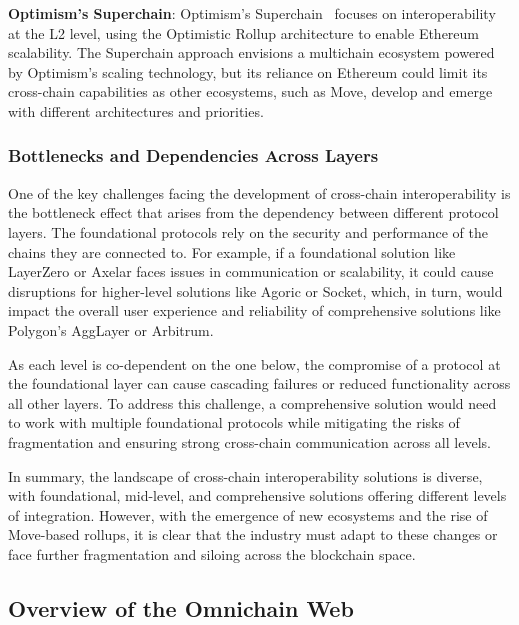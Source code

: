 \textbf{Optimism’s Superchain}: Optimism’s Superchain~\cite{optimisim} focuses on interoperability at the L2 level, using the Optimistic Rollup architecture to enable Ethereum scalability. The Superchain approach envisions a multichain ecosystem powered by Optimism’s scaling technology, but its reliance on Ethereum could limit its cross-chain capabilities as other ecosystems, such as Move, develop and emerge with different architectures and priorities.

\subsubsection{Bottlenecks and Dependencies Across Layers}

One of the key challenges facing the development of cross-chain interoperability is the bottleneck effect that arises from the dependency between different protocol layers. The foundational protocols rely on the security and performance of the chains they are connected to. For example, if a foundational solution like LayerZero or Axelar faces issues in communication or scalability, it could cause disruptions for higher-level  solutions like Agoric or Socket, which, in turn, would impact the overall user experience and reliability of comprehensive solutions like Polygon’s AggLayer or Arbitrum.

As each level is co-dependent on the one below, the compromise of a protocol at the foundational layer can cause cascading failures or reduced functionality across all other layers. To address this challenge, a comprehensive solution would need to work with multiple foundational protocols while mitigating the risks of fragmentation and ensuring strong cross-chain communication across all levels.

In summary, the landscape of cross-chain interoperability solutions is diverse, with foundational, mid-level, and comprehensive solutions offering different levels of integration. However, with the emergence of new ecosystems and the rise of Move-based rollups, it is clear that the industry must adapt to these changes or face further fragmentation and siloing across the blockchain space.

\subsection{Overview of the Omnichain Web} %

